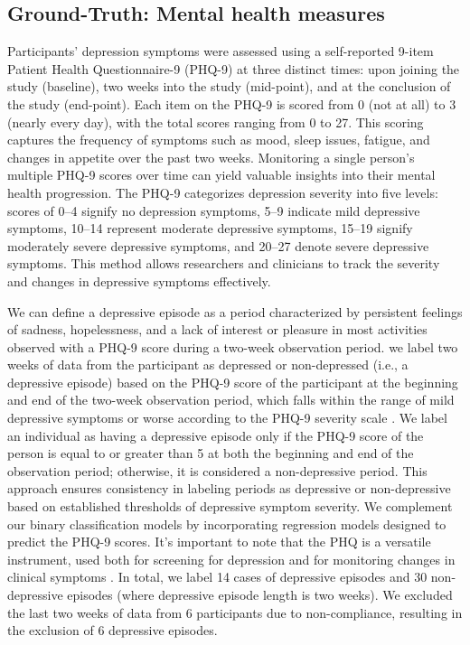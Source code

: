 \subsection{Ground-Truth: Mental health measures} \label{Sec:GT_MHM}
Participants' depression symptoms were assessed using a self-reported 9-item Patient Health Questionnaire-9 (PHQ-9) \cite{kroenke2001phq} at three distinct times: upon joining the study (baseline), two weeks into the study (mid-point), and at the conclusion of the study (end-point). Each item on the PHQ-9 is scored from 0 (not at all) to 3 (nearly every day), with the total scores ranging from 0 to 27. This scoring captures the frequency of symptoms such as mood, sleep issues, fatigue, and changes in appetite over the past two weeks. Monitoring a single person's multiple PHQ-9 scores over time can yield valuable insights into their mental health progression. The PHQ-9 categorizes depression severity into five levels: scores of 0–4 signify no depression symptoms, 5–9 indicate mild depressive symptoms, 10–14 represent moderate depressive symptoms, 15–19 signify moderately severe depressive symptoms, and 20–27 denote severe depressive symptoms. This method allows researchers and clinicians to track the severity and changes in depressive symptoms effectively.

We can define a depressive episode as a period characterized by persistent feelings of sadness, hopelessness, and a lack of interest or pleasure in most activities observed with a PHQ-9 score during a two-week observation period. we label two weeks of data from the participant as depressed or non-depressed (i.e., a depressive episode) based on the PHQ-9 score of the participant at the beginning and end of the two-week observation period, which falls within the range of mild depressive symptoms or worse according to the PHQ-9 severity scale \cite{gilbody2007screening}. We label an individual as having a depressive episode only if the PHQ-9 score of the person is equal to or greater than 5 at both the beginning and end of the observation period; otherwise, it is considered a non-depressive period. This approach ensures consistency in labeling periods as depressive or non-depressive based on established thresholds of depressive symptom severity. We complement our binary classification models by incorporating regression models designed to predict the PHQ-9 scores. It’s important to note that the PHQ is a versatile instrument, used both for screening for depression and for monitoring changes in clinical symptoms \cite{kroenke2010patient}. In total, we label 14 cases of depressive episodes and 30 non-depressive episodes (where depressive episode length is two weeks). We excluded the last two weeks of data from 6 participants due to non-compliance, resulting in the exclusion of 6 depressive episodes.


